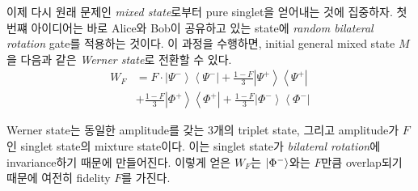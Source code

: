 \documentclass[
]{kaohandt}
\begin{document}
이제 다시 원래 문제인 \textit{mixed state}로부터 pure singlet을 얻어내는 것에 집중하자. 첫 번쨰 아이디어는 바로 Alice와 Bob이 공유하고 있는 state에 \textit{random bilateral rotation} gate를 적용하는 것이다.
이 과정을 수행하면, initial general mixed state $M$을 다음과 같은 \textit{Werner state}로 전환할 수 있다.
\begin{equation}
    \begin{aligned}
        W_F & =F \cdot\left|\Psi^{-}\right\rangle\left\langle\Psi^{-}\right|+\frac{1-F}{3}\left|\Psi^{+}\right\rangle\left\langle\Psi^{+}\right| \\
        & +\frac{1-F}{3}\left|\Phi^{+}\right\rangle\left\langle\Phi^{+}\right|+\frac{1-F}{3}\left|\Phi^{-}\right\rangle\left\langle\Phi^{-}\right|
    \end{aligned}
    \label{eq:WF}
\end{equation}

Werner state는 동일한 amplitude를 갖는 3개의 triplet state, 그리고 amplitude가 $F$인 singlet state의 mixture state이다. 이는 singlet state가 \textit{bilateral rotation}에 invariance하기 때문에 만들어진다.
이렇게 얻은 $W_F$는 $\ket{\Phi^-}$와는 $F$만큼 overlap되기 때문에 여전히 fidelity $F$를 가진다. 
\end{document}
